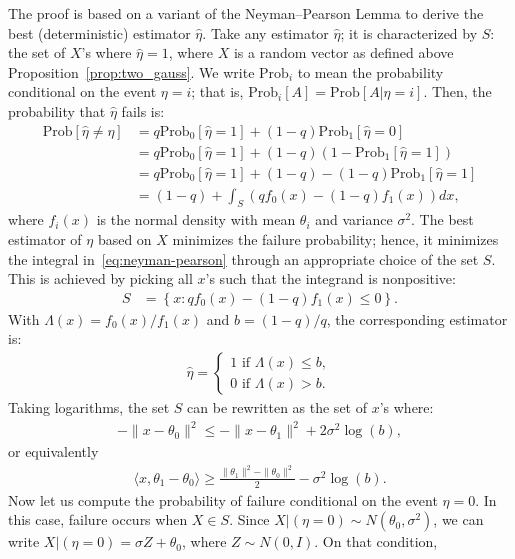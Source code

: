 \documentclass[12pt]{article}
\newcommand{\1}{\mathbf{1}}
\renewcommand{\P}{\mathrm{Prob}}
\theoremstyle{plain}
\theoremstyle{definition}
\theoremstyle{remark}
\theoremstyle{plain}
\theoremstyle{remark}
\theoremstyle{plain}
\theoremstyle{plain}
\begin{document}
The proof is based on  a variant of the Neyman--Pearson Lemma to derive the best (deterministic) estimator $\hat{\eta}$. Take any estimator $\hat{\eta}$; it is characterized by $S$: the set of $X$'s where $\hat{\eta} = 1$, where $X$ is a random vector as defined above Proposition~\ref{prop:two_gauss}. We write $\P_i$ to mean the probability conditional on the event $\eta = i$; that is, $\P_i[A] = \P[A | \eta = i]$. Then, the probability that $\hat{\eta}$ fails is:
%
\begin{align}
\label{eq:neyman-pearson}
%
\P[\hat{\eta} \ne \eta] 
&= q \P_0[\hat{\eta} = 1 ] + (1-q) \P_1[\hat{\eta} = 0]
\nonumber \\
&= q \P_0[\hat{\eta} = 1] + (1-q) (1 - \P_1[\hat{\eta} = 1])
\nonumber \\
&= q \P_0[\hat{\eta} = 1] + (1-q) - (1-q) \P_1[\hat{\eta} = 1]
\nonumber \\
&= (1-q)  + \int_S (q f_0(x) - (1-q) f_1(x))dx,
%
\end{align}
%
where $f_i(x)$ is the normal density with mean $\theta_i$ and variance $\sigma^2$. 
The best estimator of $\eta$ based on $X$ minimizes the failure probability; hence, it minimizes the integral in~\eqref{eq:neyman-pearson} through an appropriate choice of the set $S$. This is achieved by picking all $x$'s such that the integrand is nonpositive:
\begin{align*}
%
S & = \left\{x : qf_0(x) - (1-q)f_1(x) \leq 0 \right\}.
%
\end{align*}
%
With $\Lambda(x) = f_0(x) / f_1(x)$ and $b = (1-q) / q$, the corresponding estimator is:
\begin{align*}
%
\hat{\eta} = 
\begin{cases}
1  \text{ if } \Lambda(x) \leq b, \\
0  \text{ if } \Lambda(x) > b.
\end{cases}
%
\end{align*}
Taking logarithms, the set $S$ can be rewritten as the set of $x$'s where:
\begin{align*}
%
-\| x - \theta_0\|^2 \le - \|x - \theta_1\|^2 + 2 \sigma^2 \log(b),
%
\end{align*}
%
or equivalently
%
\begin{align*}
%
\langle x , \theta_1 - \theta_0 \rangle 
\ge \frac{\|\theta_1\|^2 - \|\theta_0\|^2}{2} - \sigma^2 \log(b).
%
\end{align*}
%
Now let us compute the probability of failure conditional on the event $\eta = 0$. In this case, failure occurs when $X \in S$. Since $X|(\eta=0) \sim N(\theta_0,\sigma^2)$, we can write $X | (\eta=0) = \sigma Z + \theta_0$, where $Z \sim N(0,I)$. On that condition,
\end{document}
